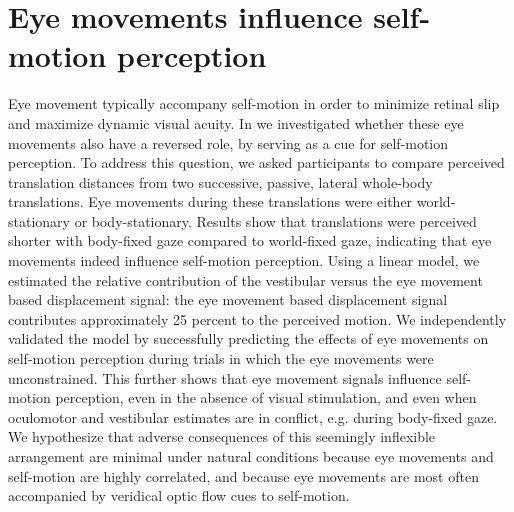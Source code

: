 \section{Eye movements influence self-motion perception}
Eye movement typically accompany self-motion in order to minimize retinal slip and maximize dynamic visual acuity. In  we investigated whether these eye movements also have a reversed role, by serving as a cue for self-motion perception. To address this question, we asked participants to compare perceived translation distances from two successive, passive, lateral whole-body translations. Eye movements during these translations were either world-stationary or body-stationary. Results show that translations were perceived shorter with body-fixed gaze compared to world-fixed gaze, indicating that eye movements indeed influence self-motion perception. Using a linear model, we estimated the relative contribution of the vestibular versus the eye movement based displacement signal: the eye movement based displacement signal  contributes approximately 25 percent to the perceived motion. We independently validated the model by successfully predicting the effects of eye movements on self-motion perception during trials in which the eye movements were unconstrained. This further shows that eye movement signals influence self-motion perception, even in the absence of visual stimulation, and even when oculomotor and vestibular estimates are in conflict, e.g. during body-fixed gaze. We hypothesize that adverse consequences of this seemingly inflexible arrangement are minimal under natural conditions because eye movements and self-motion are highly correlated, and because eye movements are most often accompanied by veridical optic flow cues to self-motion.

